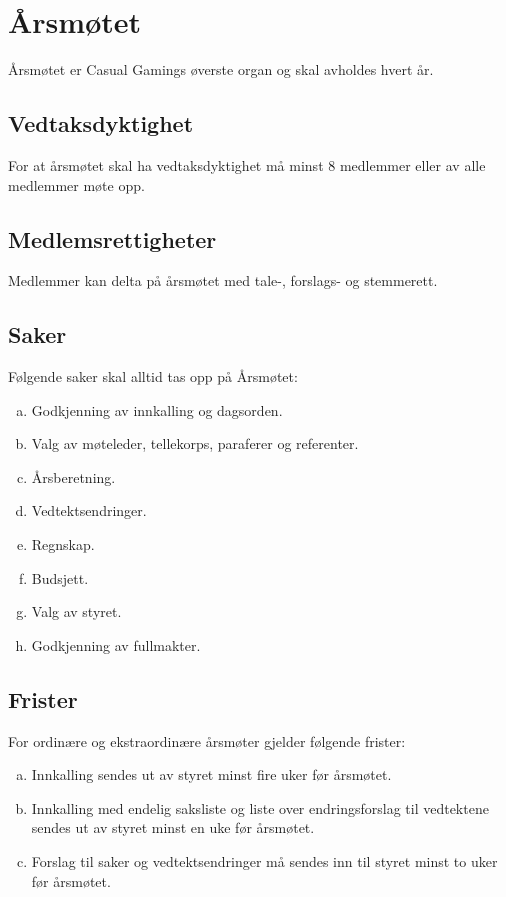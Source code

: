 \chapter{Årsmøtet}
Årsmøtet er Casual Gamings øverste organ og skal avholdes hvert år.

\section{Vedtaksdyktighet}
For at årsmøtet skal ha vedtaksdyktighet må minst 8 medlemmer eller  av alle medlemmer møte opp.

\section{Medlemsrettigheter}
Medlemmer kan delta på årsmøtet med tale-, forslags- og stemmerett.

\section{Saker}
Følgende saker skal alltid tas opp på Årsmøtet:
\begin{enumerate}[a.]
    \item Godkjenning av innkalling og dagsorden.
    \item Valg av møteleder, tellekorps, paraferer og referenter.
    \item Årsberetning.
    \item Vedtektsendringer.
    \item Regnskap.
    \item Budsjett.
    \item Valg av styret.
    \item Godkjenning av fullmakter.
\end{enumerate}

\section{Frister}
For ordinære og ekstraordinære årsmøter gjelder følgende frister:
\begin{enumerate}[a.]
    \item Innkalling sendes ut av styret minst fire uker før årsmøtet.
    \item Innkalling med endelig saksliste og liste over endringsforslag til vedtektene sendes ut av styret minst en uke før årsmøtet.
    \item Forslag til saker og vedtektsendringer må sendes inn til styret minst to uker før årsmøtet.
\end{enumerate}

